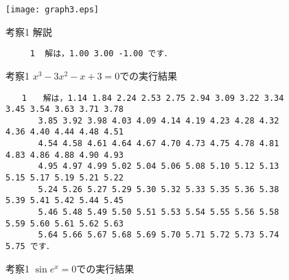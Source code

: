 \documentclass[12pt]{jarticle}
\renewcommand  \[  {\begin{eqnarray}}
\renewcommand  \]  {\end{eqnarray}}
\begin{document}
\begin{figure}[t]
  \center
  \texttt{[image: graph3.eps]}
  \caption{考察1 解説}
  \label{fig:3}
\end{figure}
\begin{figure}[t]
\begin{screen}
\begin{verbatim}
     1	解は，1.00 3.00 -1.00 です．
\end{verbatim}
\end{screen}
\caption{考察1 $x^3-3x^2-x+3=0$での実行結果}
\label{fig:3b}
\begin{screen}
\footnotesize
\begin{verbatim}
　　1　　解は，1.14 1.84 2.24 2.53 2.75 2.94 3.09 3.22 3.34 3.45 3.54 3.63 3.71 3.78
　　　　3.85 3.92 3.98 4.03 4.09 4.14 4.19 4.23 4.28 4.32 4.36 4.40 4.44 4.48 4.51
　　　　4.54 4.58 4.61 4.64 4.67 4.70 4.73 4.75 4.78 4.81 4.83 4.86 4.88 4.90 4.93
　　　　4.95 4.97 4.99 5.02 5.04 5.06 5.08 5.10 5.12 5.13 5.15 5.17 5.19 5.21 5.22
　　　　5.24 5.26 5.27 5.29 5.30 5.32 5.33 5.35 5.36 5.38 5.39 5.41 5.42 5.44 5.45
　　　　5.46 5.48 5.49 5.50 5.51 5.53 5.54 5.55 5.56 5.58 5.59 5.60 5.61 5.62 5.63
　　　　5.64 5.66 5.67 5.68 5.69 5.70 5.71 5.72 5.73 5.74 5.75 です．
\end{verbatim}
\end{screen}
\caption{考察1 $\sin e^x=0$での実行結果}
\label{fig:3c}
\end{figure}
\end{document}
